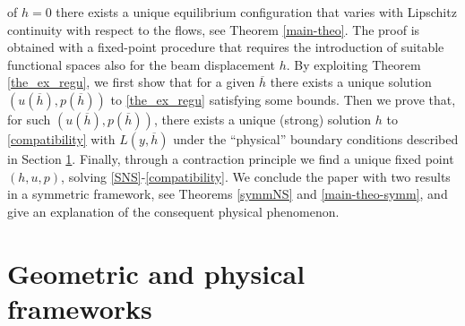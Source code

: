 \documentclass[11pt,a4paper]{amsart}
\theoremstyle{remark}
\theoremstyle{definition}
\numberwithin{equation}{section}
\numberwithin{proposition}{section}
\begin{document}
of $h=0$ there exists a unique equilibrium configuration that varies with Lipschitz continuity with respect to the flows, see Theorem \ref{main-theo}.
The proof is obtained with a fixed-point procedure that requires the introduction of suitable functional spaces also for the beam displacement $h$.
By exploiting Theorem \ref{the_ex_regu}, we first show that for a given $\overline{h}$ there exists a unique solution $(u(\overline{h}), p(\overline{h}))$ to \eqref{the_ex_regu} satisfying some bounds. Then we prove that, for such $(u(\overline{h}), p(\overline{h}))$, there exists a unique (strong) solution $h$ to \eqref{compatibility} with $L(y, \overline{h})$ under the ``physical'' boundary conditions described in Section \ref{sec_geometric}.
Finally, through a contraction principle we find a unique fixed point $(h, u,p)$, solving \eqref{SNS}-\eqref{compatibility}. We conclude the paper with two results in a symmetric framework, see Theorems \ref{symmNS} and \ref{main-theo-symm}, and give an explanation of the consequent physical phenomenon.
	
	\section{Geometric and physical frameworks}\label{sec_geometric}
	
\end{document}
